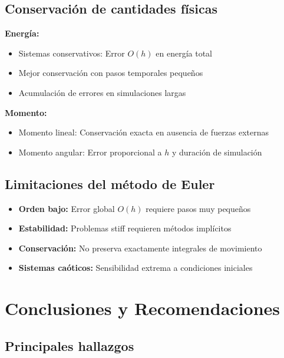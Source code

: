 \documentclass{article}
\begin{document}
	\subsection{Conservación de cantidades físicas}
	
	\textbf{Energía:}
	\begin{itemize}
	\item Sistemas conservativos: Error $O(h)$ en energía total
	\item Mejor conservación con pasos temporales pequeños
	\item Acumulación de errores en simulaciones largas
	\end{itemize}
	
	\textbf{Momento:}
	\begin{itemize}
	\item Momento lineal: Conservación exacta en ausencia de fuerzas externas
	\item Momento angular: Error proporcional a $h$ y duración de simulación
	\end{itemize}
	
	\subsection{Limitaciones del método de Euler}
	
	\begin{itemize}
		\item \textbf{Orden bajo:} Error global $O(h)$ requiere pasos muy pequeños
		\item \textbf{Estabilidad:} Problemas stiff requieren métodos implícitos
		\item \textbf{Conservación:} No preserva exactamente integrales de movimiento
		\item \textbf{Sistemas caóticos:} Sensibilidad extrema a condiciones iniciales
	\end{itemize}

	\section{Conclusiones y Recomendaciones}
	
	\subsection{Principales hallazgos}
	
\end{document}
